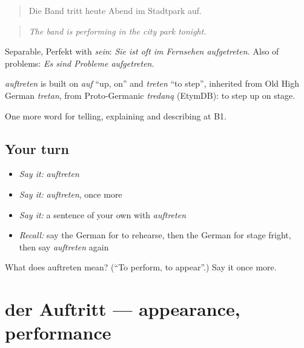 \begin{quote}
Die Band tritt heute Abend im Stadtpark auf.
\end{quote}

\begin{quote}
\emph{The band is performing in the city park tonight.}
\end{quote}

Separable, Perfekt with \emph{sein}: \emph{Sie ist oft im Fernsehen aufgetreten.} Also of problems: \emph{Es sind Probleme aufgetreten.}

\begin{cousinweb}
\emph{auftreten} is built on \emph{auf} \textquotedblleft{}up, on\textquotedblright{} and \emph{treten} \textquotedblleft{}to step\textquotedblright{}, inherited from Old High German \emph{tretan}, from Proto-Germanic \emph{tredaną} (EtymDB): to step up on stage.
\end{cousinweb}

\begin{grammarlens}[title={What you've built}]
One more word for telling, explaining and describing at B1.
\end{grammarlens}

\subsection*{Your turn}
\begin{itemize}
\raggedright
  \item \emph{Say it:} \emph{auftreten}
  \item \emph{Say it:} \emph{auftreten}, once more
  \item \emph{Say it:} a sentence of your own with \emph{auftreten}
  \item \emph{Recall:} say the German for to rehearse, then the German for stage fright, then say \emph{auftreten} again
\end{itemize}

\begin{tcolorbox}[breakable,colback=teal!4,colframe=teal!35!black,title={Before you move on}]
What does auftreten mean? (\textquotedblleft{}To perform, to appear\textquotedblright{}.) Say it once more.
\end{tcolorbox}
\section[der Auftritt]{der Auftritt — appearance, performance}

\label{lesson:GE-C516-auftritt}



